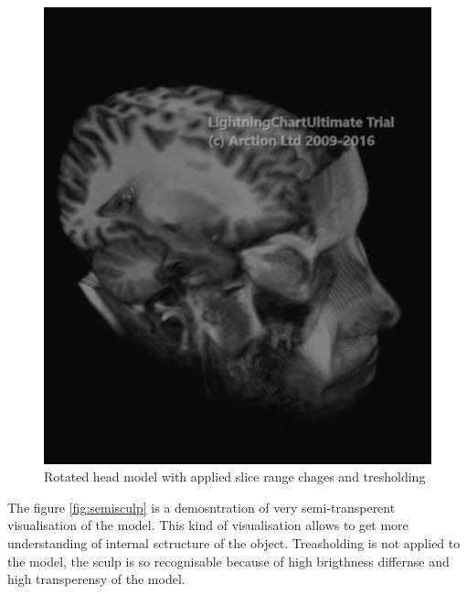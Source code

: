 \documentclass[twoside, english, 11pt]{report}
\begin{document}
\begin{figure}[H]
\centerline{\includegraphics[scale = 0.5]{img/cuttedhead}}
\caption{Rotated head model with applied slice range chages and tresholding\label{fig:sculp}}
\end{figure}

The figure \ref{fig:semisculp} is a demosntration of very semi-transperent visualisation of the model. This kind of visualisation allows to get more understanding of internal sctructure of the object. Treasholding is not applied to the model, the sculp is so recognisable because of high brigthness differnse and high transperensy of the model.
\end{document}
